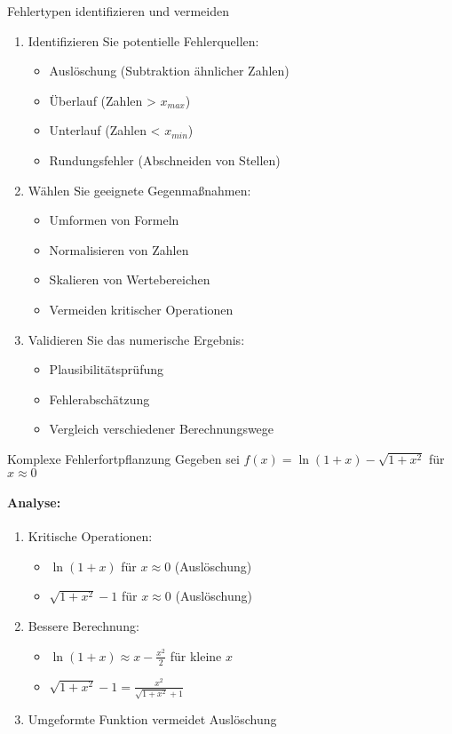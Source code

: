 \begin{KR}{Fehlertypen identifizieren und vermeiden}
\begin{enumerate}
    \item Identifizieren Sie potentielle Fehlerquellen:
    \begin{itemize}
        \item Auslöschung (Subtraktion ähnlicher Zahlen)
        \item Überlauf (Zahlen > $x_{max}$)
        \item Unterlauf (Zahlen < $x_{min}$)
        \item Rundungsfehler (Abschneiden von Stellen)
    \end{itemize}
    \item Wählen Sie geeignete Gegenmaßnahmen:
    \begin{itemize}
        \item Umformen von Formeln
        \item Normalisieren von Zahlen
        \item Skalieren von Wertebereichen
        \item Vermeiden kritischer Operationen
    \end{itemize}
    \item Validieren Sie das numerische Ergebnis:
    \begin{itemize}
        \item Plausibilitätsprüfung
        \item Fehlerabschätzung
        \item Vergleich verschiedener Berechnungswege
    \end{itemize}
\end{enumerate}
\end{KR}

\begin{example2}{Komplexe Fehlerfortpflanzung}
Gegeben sei $f(x) = \ln(1+x) - \sqrt{1+x^2}$ für $x \approx 0$
\paragraph{Analyse:}
\begin{enumerate}
    \item Kritische Operationen:
    \begin{itemize}
        \item $\ln(1+x)$ für $x \approx 0$ (Auslöschung)
        \item $\sqrt{1+x^2}-1$ für $x \approx 0$ (Auslöschung)
    \end{itemize}
    \item Bessere Berechnung:
    \begin{itemize}
        \item $\ln(1+x) \approx x - \frac{x^2}{2}$ für kleine $x$
        \item $\sqrt{1+x^2}-1 = \frac{x^2}{\sqrt{1+x^2}+1}$
    \end{itemize}
    \item Umgeformte Funktion vermeidet Auslöschung
\end{enumerate}
\end{example2}

